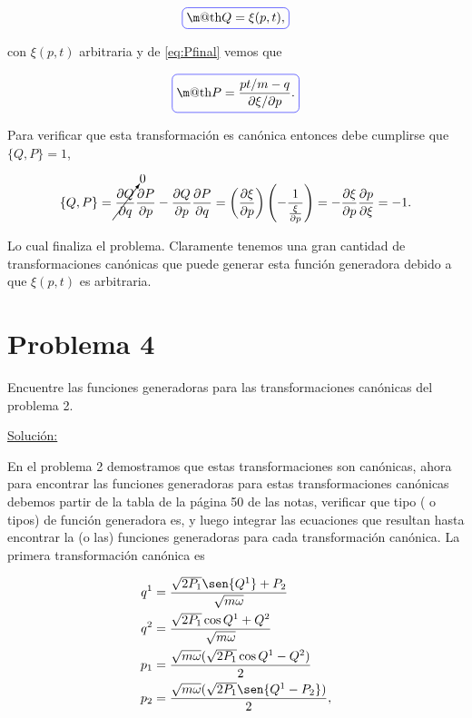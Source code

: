 \documentclass[a4paper,10pt]{article}
\makeatletter
\numberwithin{equation}{section}
\newcommand*{\boxcolor}{blue}
\renewcommand{\boxed}[1]{\textcolor{\boxcolor}{%
\tikz[baseline={([yshift=-1ex]current bounding box.center)}] \node [rectangle, minimum width=1ex,rounded corners,draw] {\normalcolor\m@th$\displaystyle#1$};}}
\makeatother
\begin{document}
\begin{equation}
  \boxed{Q = \xi(p,t),}
\end{equation}

con $\xi(p,t)$ arbitraria y de \eqref{eq:Pfinal} vemos que 

\begin{equation}
 \boxed{P = \frac{pt/m - q}{\partial \xi/\partial p}.}
\end{equation}

Para verificar que esta transformación es canónica entonces debe cumplirse que 
$\{Q,P\} = 1$, 

\begin{equation}
 \{Q,P\} = \cancelto{0}{\frac{\partial Q}{\partial q}}\frac{\partial P}{\partial p} - 
 \frac{\partial Q}{\partial p}\frac{\partial P}{\partial q} = 
 \left(\frac{\partial \xi}{\partial p}\right)\left(- \frac{1}{\frac{\xi}{\partial p}} \right) = 
 - \frac{\partial \xi}{\partial p}\frac{\partial p}{\partial \xi} = -1.
\end{equation}

Lo cual finaliza el problema. Claramente tenemos una gran cantidad de transformaciones 
canónicas que puede generar esta función generadora debido a que $\xi(p,t)$ es arbitraria.



\section{Problema 4}

Encuentre las funciones generadoras para las transformaciones canónicas del problema 
2.

\vspace{.3cm}

\underline{Solución:} \vspace{.3cm}

En el problema 2 demostramos que estas transformaciones son canónicas, ahora para 
encontrar las funciones generadoras para estas transformaciones canónicas debemos 
partir de la tabla de la página 50 de las notas, verificar que tipo ( o tipos) de 
función generadora es, y luego integrar las ecuaciones que resultan hasta encontrar
la (o las) funciones generadoras para cada transformación canónica. La primera 
transformación canónica es 

\begin{align*}
 q^1 &= \frac{\sqrt{2P_1}\sen{Q^1}+P_2}{\sqrt{m\omega}} \\
 q^2 &= \frac{\sqrt{2P_1}\cos{Q^1}+Q^2}{\sqrt{m\omega}} \\
 p_1 &= \frac{\sqrt{m\omega}(\sqrt{2P_1}\cos{Q^1 - Q^2})}{2} \\
 p_2 &= \frac{\sqrt{m\omega}(\sqrt{2P_1}\sen{Q^1 - P_2})}{2}, 
\end{align*}
\end{document}
